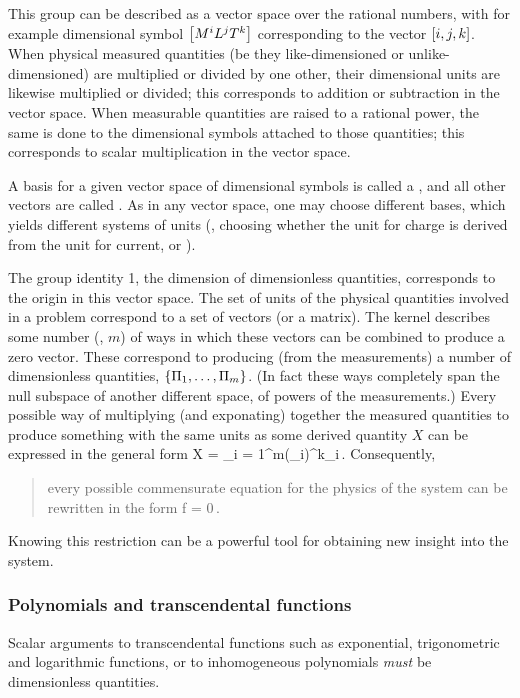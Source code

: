 This group can be described as a vector space over the rational numbers, with for example dimensional symbol $\left[{M^iL^jT^k}\right]$ corresponding to the vector $\left[{i,j,k}\right]$. When physical measured quantities (be they like-dimensioned or unlike-dimensioned) are multiplied or divided by one other, their dimensional units are likewise multiplied or divided; this corresponds to addition or subtraction in the vector space. When measurable quantities are raised to a rational power, the same is done to the dimensional symbols attached to those quantities; this corresponds to scalar multiplication in the vector space.

A basis for a given vector space of dimensional symbols is called a , and all other vectors are called . As in any vector space, one may choose different bases, which yields different systems of units (\eg, choosing whether the unit for charge is derived from the unit for current, or \vis).

The group identity 1, the dimension of dimensionless quantities, corresponds to the origin in this vector space.
The set of units of the physical quantities involved in a problem correspond to a set of vectors (or a matrix). The kernel describes some number (\eg, $m$) of ways in which these vectors can be combined to produce a zero vector. These correspond to producing (from the measurements) a number of dimensionless quantities, $\left\lbrace{\Pi_1,\dotsc,\Pi_m}\right\rbrace$. (In fact these ways completely span the null subspace of another different space, of powers of the measurements.) Every possible way of multiplying (and exponating) together the measured quantities to produce something with the same units as some derived quantity $X$ can be expressed in the general form 
\beq
X = \prod_{i = 1}^{m}\left(\kdim_i\right)^{k_i}\,.
\eeq
Consequently, 
\begin{quote}
every possible commensurate equation for the physics of the system can be rewritten in the form 
\beq
f = 0\,.
\eeq 
\end{quote}
Knowing this restriction can be a powerful tool for obtaining new insight into the system.


\subsubsection{Polynomials and transcendental functions}
Scalar arguments to transcendental functions such as exponential, trigonometric and logarithmic functions, or to inhomogeneous polynomials \emph{must} be dimensionless quantities. 

